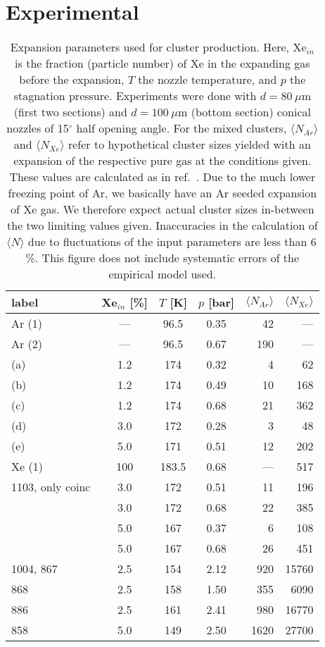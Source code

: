 \section{Experimental}
%
\begin{table}
\caption{
Expansion parameters used for cluster production. Here, Xe$_{in}$ is the fraction (particle number) of Xe in the expanding gas before the expansion, $T$ the nozzle temperature, and $p$ the stagnation pressure. Experiments were done with $d = 80~\mu$m (first two sections) and $d = 100~\mu$m (bottom section) conical nozzles of 15$^\circ$ half opening angle. For the mixed clusters, $\langle N_{Ar} \rangle$ and $\langle N_{Xe} \rangle$ refer to hypothetical cluster sizes yielded with an expansion of the respective pure gas at the conditions given. These values are calculated as in ref.\ \protect{}. Due to the much lower freezing point of Ar, we basically have an Ar seeded expansion of Xe gas. We therefore expect actual cluster sizes in-between the two limiting values given. Inaccuracies in the calculation of $\langle N\rangle$ due to fluctuations of the input parameters are less than 6\,\%. This figure does not include systematic errors of the empirical model used.
}
\label{tab:cluster}

\begin{tabular}{l c c c r r}
%
\toprule
  label  &  Xe$_{in}$ [\%]  &  $T$ [K]  &  $p$ [bar] & $\langle N_{Ar} \rangle$ & $\langle N_{Xe} \rangle$ \\
%
\midrule
Ar (1)  & --- &  96.5  & 0.35  &  42  &  --- \\
Ar (2)  & --- &  96.5  & 0.67  & 190  &  --- \\
 (a) & 1.2 &  174   & 0.32  &   4  &   62 \\
 (b) & 1.2 &  174   & 0.49  &  10  &  168 \\
 (c) & 1.2 &  174   & 0.68  &  21  &  362 \\
 (d) & 3.0 &  172   & 0.28  &   3  &   48 \\
 (e) & 5.0 &  171   & 0.51  &  12  &  202 \\
Xe (1)  & 100 & 183.5  & 0.68  & ---  &  517 \\     
\midrule
1103, only coinc  & 3.0 &  172   & 0.51  &  11  &  196 \\
  & 3.0 &  172   & 0.68  &  22  &  385 \\
  & 5.0 &  167   & 0.37  &   6  &  108 \\
  & 5.0 &  167   & 0.68  &  26  &  451 \\
\midrule
1004, 867  & 2.5 &  154   & 2.12  &  920 & 15760\\
868  & 2.5 &  158   & 1.50  &  355 &  6090\\
886  & 2.5 &  161   & 2.41  &  980 & 16770\\
858  & 5.0 &  149   & 2.50  & 1620 & 27700\\
%
\bottomrule
\end{tabular}
\end{table}
